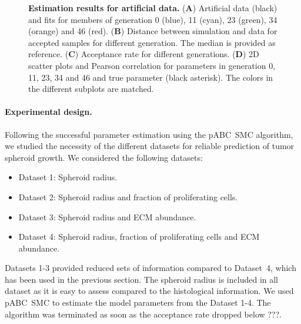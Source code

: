 \documentclass[10pt,letterpaper]{article}
\newcommand{\jh}[1]{{\color{red}#1}}
\begin{document}
\begin{figure}[p]
\begin{adjustwidth}{-2in}{0in} %
\vspace*{0.5cm}
\caption{{\bf Estimation results for artificial data.}
(\textbf{A}) Artificial data (black) and fits for members of generation 0 (blue), 11 (cyan), 23 (green), 34 (orange) and 46 (red).
(\textbf{B}) Distance between simulation and data for accepted samples for different generation. The median is provided as reference. 
(\textbf{C}) Acceptance rate for different generations.
(\textbf{D}) 2D scatter plots and Pearson correlation for parameters in generation 0, 11, 23, 34 and 46 and true parameter (black asterisk). 
The colors in the different subplots are matched.
}
\label{fig: inference using 2D model}
\end{adjustwidth}
\end{figure}

\paragraph*{Experimental design.}
Following the successful parameter estimation using the pABC~SMC algorithm, we studied the necessity of the different datasets for reliable prediction of tumor spheroid growth. We considered the following datasets:
\begin{itemize}
\item Dataset 1: Spheroid radius.
\item Dataset 2: Spheroid radius and fraction of proliferating cells.
\item Dataset 3: Spheroid radius and ECM abundance.
\item Dataset 4: Spheroid radius, fraction of proliferating cells and ECM abundance.
\end{itemize}
Datasets 1-3 provided reduced sets of information compared to Dataset~4, which has been used in the previous section. The spheroid radius is included in all dataset as it is easy to assess compared to the histological information. We used pABC~SMC to estimate the model parameters from the Dataset 1-4. The algorithm was terminated as soon as the acceptance rate dropped below \jh{???}.
\end{document}
